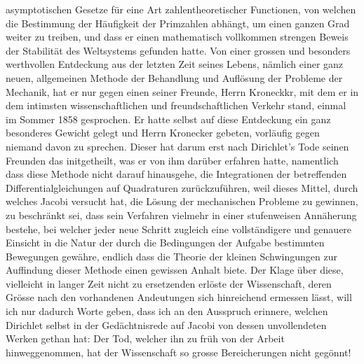 \documentclass[11pt]{article}
\begin{document}
\noindent asymptotischen Gesetze für eine Art zahlentheoretischer Functionen, von welchen die Bestimmung der Häufigkeit der Primzahlen abhängt, um einen ganzen Grad weiter zu treiben, und dass er einen mathematisch vollkommen strengen Beweis der Stabilität des Weltsystems gefunden hatte. Von einer grossen und besonders werthvollen Entdeckung aus der letzten Zeit seines Lebens, nämlich einer ganz neuen, allgemeinen Methode der Behandlung und Auflösung der Probleme der Mechanik, hat er nur gegen einen seiner Freunde, Herrn Kroneckkr, mit dem er in dem intimsten wissenschaftlichen und freundschaftlichen Verkehr stand, einmal im Sommer 1858 gesprochen. Er hatte selbst auf diese Entdeckung ein ganz besonderes Gewicht gelegt und Herrn Kronecker gebeten, vorläufig gegen niemand davon zu sprechen. Dieser hat darum erst nach Dirichlet’s Tode seinen Freunden das initgetheilt, was er von ihm darüber erfahren hatte, namentlich dass diese Methode nicht darauf hinausgehe, die Integrationen der betreffenden Differentialgleichungen auf Quadraturen zurückzuführen, weil dieses Mittel, durch welches Jacobi versucht hat, die Lösung der mechanischen Probleme zu gewinnen, zu beschränkt sei, dass sein Verfahren vielmehr in einer stufenweisen Annäherung bestehe, bei welcher jeder neue Schritt zugleich eine vollständigere und genauere Einsicht in die Natur der durch die Bedingungen der Aufgabe bestimmten Bewegungen gewähre, endlich dass die Theorie der kleinen Schwingungen zur Auffindung dieser Methode einen gewissen Anhalt biete. Der Klage über diese, vielleicht in langer Zeit nicht zu ersetzenden   erlöste der Wissenschaft, deren Grösse nach den vorhandenen Andeutungen sich hinreichend ermessen lässt, will ich nur dadurch Worte geben, dass ich an den Ausspruch erinnere, welchen Dirichlet selbst in der Gedächtnisrede auf Jacobi von dessen unvollendeten Werken gethan hat: Der Tod, welcher ihn zu früh von der Arbeit hinweggenommen, hat der Wissenschaft so grosse Bereicherungen nicht gegönnt!
\par
\end{document}
